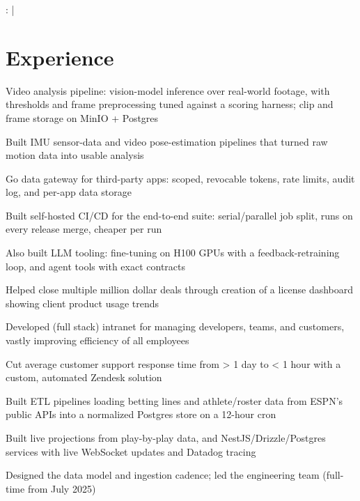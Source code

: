 \documentclass[print]{jack-resume}
\begin{document}
\raggedright{
    :
      \href{https://www.linkedin.com/in/jack-sturtevant/}{ \ExternalLink} |
     \href{https://github.com/jacksturt}{ \ExternalLink}}

\section{Experience}

\begin{tightemize}
    \item Video analysis pipeline: vision-model inference over real-world footage, with thresholds and frame preprocessing tuned against a scoring harness; clip and frame storage on MinIO + Postgres
    \item Built IMU sensor-data and video pose-estimation pipelines that turned raw motion data into usable analysis
    \item Go data gateway for third-party apps: scoped, revocable tokens, rate limits, audit log, and per-app data storage
    \item Built self-hosted CI/CD for the end-to-end suite: serial/parallel job split, runs on every release merge, cheaper per run
    \item Also built LLM tooling: fine-tuning on H100 GPUs with a feedback-retraining loop, and agent tools with exact contracts
\end{tightemize}
\sectionsep

\begin{tightemize}
    \item Helped close multiple million dollar deals through creation of a license dashboard showing client product usage trends
    \item Developed (full stack) intranet for managing developers, teams, and customers, vastly improving efficiency of all employees
    \item Cut average customer support response time from > 1 day to < 1 hour with a custom, automated Zendesk solution
\end{tightemize}
\sectionsep

\begin{tightemize}
    \item Built ETL pipelines loading betting lines and athlete/roster data from ESPN's public APIs into a normalized Postgres store on a 12-hour cron
    \item Built live projections from play-by-play data, and NestJS/Drizzle/Postgres services with live WebSocket updates and Datadog tracing
    \item Designed the data model and ingestion cadence; led the engineering team (full-time from July 2025)
\end{tightemize}
\sectionsep
\end{document}
